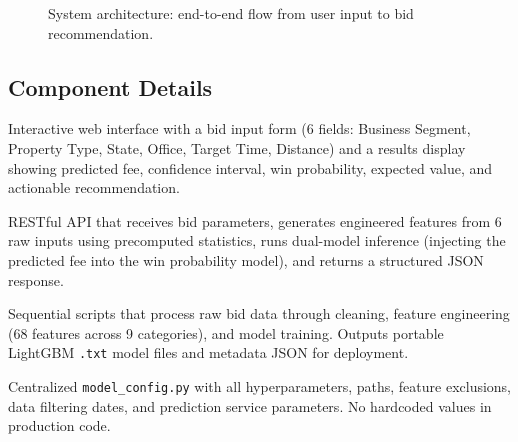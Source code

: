 \documentclass[12pt,a4paper]{article}
\begin{document}
\begin{figure}[H]
{%
}
\caption{System architecture: end-to-end flow from user input to bid recommendation.}
\label{fig:architecture}
\end{figure}

\subsection{Component Details}

\begin{description}[style=nextline]
    \item[\textbf{React Frontend (Vercel)}]
    Interactive web interface with a bid input form (6 fields: Business Segment, Property Type, State, Office, Target Time, Distance) and a results display showing predicted fee, confidence interval, win probability, expected value, and actionable recommendation.

    \item[\textbf{Flask API (Render)}]
    RESTful API that receives bid parameters, generates engineered features from 6 raw inputs using precomputed statistics, runs dual-model inference (injecting the predicted fee into the win probability model), and returns a structured JSON response.

    \item[\textbf{ML Training Pipeline (Offline)}]
    Sequential scripts that process raw bid data through cleaning, feature engineering (68 features across 9 categories), and model training. Outputs portable LightGBM \texttt{.txt} model files and metadata JSON for deployment.

    \item[\textbf{Configuration Layer}]
    Centralized \texttt{model\_config.py} with all hyperparameters, paths, feature exclusions, data filtering dates, and prediction service parameters. No hardcoded values in production code.
\end{description}
\end{document}
